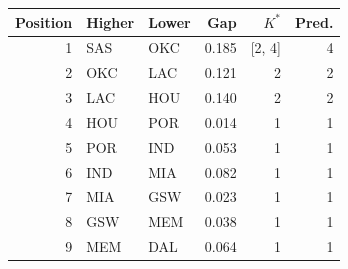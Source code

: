 \begin{tabular}{rllrrr}
\toprule
Position & Higher & Lower & Gap & $K^*$ & Pred. \\
\midrule
1 & SAS & OKC & 0.185 & [2, 4] & 4 \\
2 & OKC & LAC & 0.121 & 2 & 2 \\
3 & LAC & HOU & 0.140 & 2 & 2 \\
4 & HOU & POR & 0.014 & 1 & 1 \\
5 & POR & IND & 0.053 & 1 & 1 \\
6 & IND & MIA & 0.082 & 1 & 1 \\
7 & MIA & GSW & 0.023 & 1 & 1 \\
8 & GSW & MEM & 0.038 & 1 & 1 \\
9 & MEM & DAL & 0.064 & 1 & 1 \\
\bottomrule
\end{tabular}
